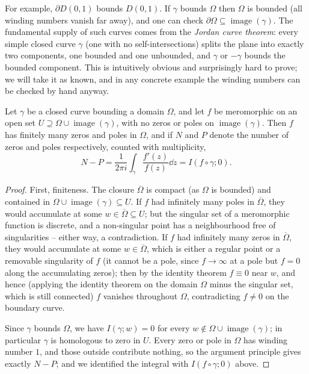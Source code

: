 \documentclass[a4paper]{scrartcl}
\begin{document}
For example, $\partial D(0, 1)$ bounds $D(0, 1)$. If $\gamma$ bounds $\Omega$ then $\Omega$ is bounded (all winding numbers vanish far away), and one can check $\partial \Omega \subseteq \operatorname{image}(\gamma)$. The fundamental supply of such curves comes from the \emph{Jordan curve theorem}: every simple closed curve $\gamma$ (one with no self-intersections) splits the plane into exactly two components, one bounded and one unbounded, and $\gamma$ or $-\gamma$ bounds the bounded component. This is intuitively obvious and surprisingly hard to prove; we will take it as known, and in any concrete example the winding numbers can be checked by hand anyway.

\begin{corollary}
    Let $\gamma$ be a closed curve bounding a domain $\Omega$, and let $f$ be meromorphic on an open set $U \supseteq \Omega \cup \operatorname{image}(\gamma)$, with no zeros or poles on $\operatorname{image}(\gamma)$. Then $f$ has finitely many zeros and poles in $\Omega$, and if $N$ and $P$ denote the number of zeros and poles respectively, counted with multiplicity,
    $$
    N - P = \frac{1}{2 \pi i}\int_\gamma \frac{f'(z)}{f(z)} \dd z = I(f \circ \gamma; 0).
    $$
\end{corollary}
\begin{proof}
    First, finiteness. The closure $\overline{\Omega}$ is compact (as $\Omega$ is bounded) and contained in $\Omega \cup \operatorname{image}(\gamma) \subseteq U$. If $f$ had infinitely many poles in $\overline{\Omega}$, they would accumulate at some $w \in \overline{\Omega} \subseteq U$; but the singular set of a meromorphic function is discrete, and a non-singular point has a neighbourhood free of singularities -- either way, a contradiction. If $f$ had infinitely many zeros in $\overline{\Omega}$, they would accumulate at some $w \in \overline{\Omega}$, which is either a regular point or a removable singularity of $f$ (it cannot be a pole, since $f \rightarrow \infty$ at a pole but $f = 0$ along the accumulating zeros); then by the identity theorem $f \equiv 0$ near $w$, and hence (applying the identity theorem on the domain $\Omega$ minus the singular set, which is still connected) $f$ vanishes throughout $\Omega$, contradicting $f \neq 0$ on the boundary curve.

    Since $\gamma$ bounds $\Omega$, we have $I(\gamma; w) = 0$ for every $w \notin \Omega \cup \operatorname{image}(\gamma)$; in particular $\gamma$ is homologous to zero in $U$. Every zero or pole in $\Omega$ has winding number $1$, and those outside contribute nothing, so the argument principle gives exactly $N - P$; and we identified the integral with $I(f \circ \gamma; 0)$ above.
\end{proof}
\end{document}
